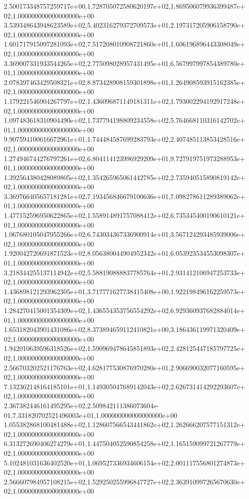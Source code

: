 2.500173348757259717e+00,1.728705072580620197e+02,1.869506079936399487e+02,1.000000000000000000e+00
3.539348643948623589e+02,5.402316279372709573e+01,2.197317205906158790e+02,1.000000000000000000e+00
1.601717915097281093e+02,7.517208010908721860e+01,1.606196896443308049e+02,1.000000000000000000e+00
3.369007331933544265e+02,2.775098028957431495e+01,6.567997997854389780e+01,1.000000000000000000e+00
2.078397463429508321e+02,8.873428908159301898e+01,1.264908593915162385e+02,1.000000000000000000e+00
1.179221546904267797e+02,1.436096871149181311e+02,1.793002294192917248e+02,1.000000000000000000e+00
1.097483618310904490e+02,1.737794198809234558e+02,5.764668110316142702e+01,1.000000000000000000e+00
9.907594100616672961e+01,1.744484587699283793e+02,2.407485113853428516e+02,1.000000000000000000e+00
1.274946744276797261e+02,6.804114123996929209e+01,9.727919751973288953e+01,1.000000000000000000e+00
1.392564380428089805e+02,1.354265965061442785e+02,2.735940515890819142e+02,1.000000000000000000e+00
3.369766405657181281e+02,7.193456846679100636e+01,7.098278611289389062e+01,1.000000000000000000e+00
1.477152596950622865e+02,1.558914891757088412e+02,6.735345400190610121e+01,1.000000000000000000e+00
1.067680105047955266e+02,6.743034367336900914e+01,3.567124293485939006e+02,1.000000000000000000e+00
1.920042720691871523e+02,8.056380044904952342e+01,6.053923534553098307e+01,1.000000000000000000e+00
3.218344255137114942e+02,5.588190888837785764e+01,2.931412106947253733e+02,1.000000000000000000e+00
1.436898121293962305e+01,3.717771627738415408e+00,1.922198496162259573e+02,1.000000000000000000e+00
1.284270415001354309e+02,1.436554353756554292e+02,6.929360937682884014e+01,1.000000000000000000e+00
1.653182043901431086e+02,8.373894659112410821e+00,3.186436119971320409e+02,1.000000000000000000e+00
1.942010639596318526e+02,1.590969478645851893e+02,2.428125447185797725e+02,1.000000000000000000e+00
2.566703202521176763e+02,4.628177530876970280e+01,2.906690032077160595e+02,1.000000000000000000e+00
7.132362148164185101e+01,1.149305047689142043e+02,2.626731414292293607e+02,1.000000000000000000e+00
2.367382446161495295e+02,2.509842111386073604e-01,7.331820702521496003e+01,1.000000000000000000e+00
1.055382868100481488e+02,1.128607566543441862e+02,1.262666207577151312e+02,1.000000000000000000e+00
6.313272690406274279e+01,1.447504052590854258e+02,1.165159099721267779e+02,1.000000000000000000e+00
5.102481031636402520e+01,1.069527336934606154e+02,2.001117556801274873e+02,1.000000000000000000e+00
2.566607984957108215e+02,1.529250255996847727e+02,2.363910997265670630e+02,1.000000000000000000e+00
